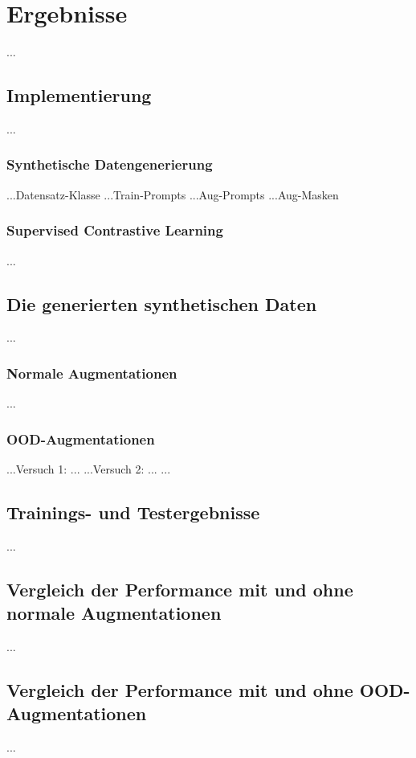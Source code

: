 \chapter{Ergebnisse}

...

\section{Implementierung}

...

\subsection{Synthetische Datengenerierung}

...Datensatz-Klasse
...Train-Prompts
...Aug-Prompts
...Aug-Masken

\subsection{Supervised Contrastive Learning}

...

\section{Die generierten synthetischen Daten}

...

\subsection{Normale Augmentationen}

...

\subsection{OOD-Augmentationen}

...Versuch 1: ...
...Versuch 2: ...
...

\section{Trainings- und Testergebnisse}

...

\section{Vergleich der Performance mit und ohne normale Augmentationen}

...

\section{Vergleich der Performance mit und ohne OOD-Augmentationen}

...